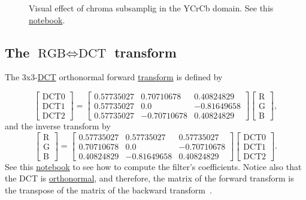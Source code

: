 \begin{figure}
  \centering
  \caption{Visual effect of chroma subsamplig in the YCrCb domain. See
    this
    \href{https://github.com/Sistemas-Multimedia/Sistemas-Multimedia.github.io/blob/master/milestones/06-YUV_compression/chroma_subsampling.ipynb}{notebook}.}
  \label{fig:san-diego_chroma_subsampled}
\end{figure}


\subsection{The $\text{RGB}\Leftrightarrow\text{DCT}$ transform}
The
3x3-\href{https://en.wikipedia.org/wiki/Discrete_cosine_transform}{DCT}
orthonormal forward
\href{https://vicente-gonzalez-ruiz.github.io/transform_coding/}{transform}
is defined by

\begin{equation}
  \begin{bmatrix}
    \text{DCT0} \\
    \text{DCT1} \\
    \text{DCT2}
  \end{bmatrix}
  =
  \begin{bmatrix}
    0.57735027 & 0.70710678 & 0.40824829 \\
    0.57735027 & 0.0 & -0.81649658 \\
    0.57735027 & -0.70710678 & 0.40824829
  \end{bmatrix}
  \begin{bmatrix}
    \text{R} \\
    \text{G} \\
    \text{B}
  \end{bmatrix},
\end{equation}
and the inverse transform by
\begin{equation}
  \begin{bmatrix}
    \text{R} \\
    \text{G} \\
    \text{B}
  \end{bmatrix}
  =
  \begin{bmatrix}
    0.57735027 & 0.57735027 & 0.57735027 \\
    0.70710678 & 0.0 & -0.70710678 \\
    0.40824829 & -0.81649658 & 0.40824829
  \end{bmatrix}
  \begin{bmatrix}
    \text{DCT0} \\
    \text{DCT1} \\
    \text{DCT2}
  \end{bmatrix}.
\end{equation}
See this
\href{https://github.com/Sistemas-Multimedia/Sistemas-Multimedia.github.io/blob/master/milestones/06-YUV_compression/color-DCT_matrix.ipynb}{notebook}
to see how to compute the filter's coefficients. Notice also that the
DCT is
\href{https://vicente-gonzalez-ruiz.github.io/transform_coding/}{orthonormal},
and therefore, the matrix of the forward transform is the transpose of the
matrix of the backward transform~\cite{sayood2017introduction}.

